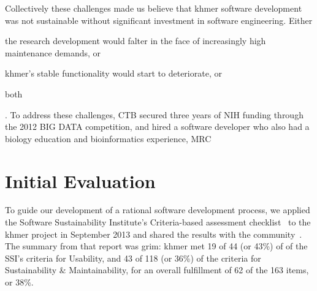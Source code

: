 \documentclass[12pt]{article}
\begin{document}
Collectively these challenges made us believe that khmer software
development was not sustainable without significant investment in
software engineering. Either \begin{inparaenum}[(1)] the research development
would falter in the face of increasingly high maintenance demands, or \item
khmer's stable functionality would start to deteriorate, or \item
both\end{inparaenum}.  To address these
challenges, CTB secured three years of NIH funding through the 2012
BIG DATA competition, and hired a software developer who also had a biology
education and bioinformatics experience, MRC\@







\section{Initial Evaluation}

To guide our development of a rational software development process,
we applied the Software Sustainability Institute's Criteria-based
assessment checklist~\cite{SSI-eval-guide} to the khmer project in
September 2013 and shared the results with the
community~\cite{khmer-assessment}. The summary from that report was grim: khmer
met 19 of 44 (or 43\%) of of the SSI's criteria for Usability, and 43
of 118 (or 36\%) of the criteria for Sustainability \& Maintainability, for an 
overall fulfillment of 62 of the 163 items, or 38\%.
\end{document}
